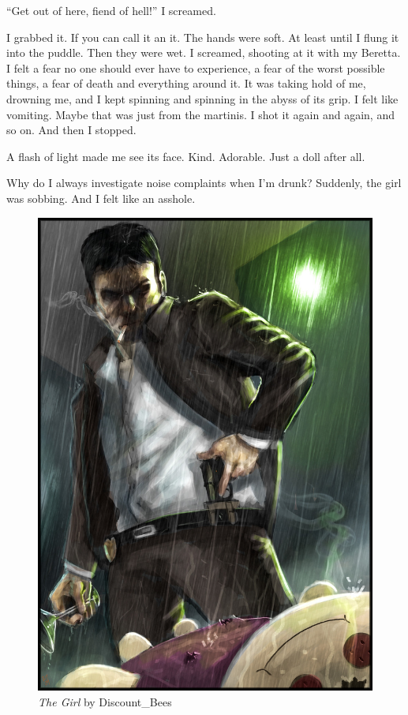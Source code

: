 ``Get out of here, fiend of hell!'' I screamed.



I grabbed it. If you can call it an it. The hands were soft. At
least until I flung it into the puddle. Then they were wet. I
screamed, shooting at it with my Beretta. I felt a fear no one
should ever have to experience, a fear of the worst possible
things, a fear of death and everything around it. It was taking
hold of me, drowning me, and I kept spinning and spinning in the
abyss of its grip. I felt like vomiting. Maybe that was just from
the martinis. I shot it again and again, and so on. And then I
stopped.



A flash of light made me see its face. Kind. Adorable. Just a doll
after all.



Why do I always investigate noise complaints when I'm drunk?
Suddenly, the girl was sobbing. And I felt like an asshole. 

 


\begin{figure}[b]
  \includegraphics[width=\textwidth]{art/Discount_Bees-The_Girl.jpg}
  \caption{{\em The Girl} by Discount\_Bees}
\end{figure}
